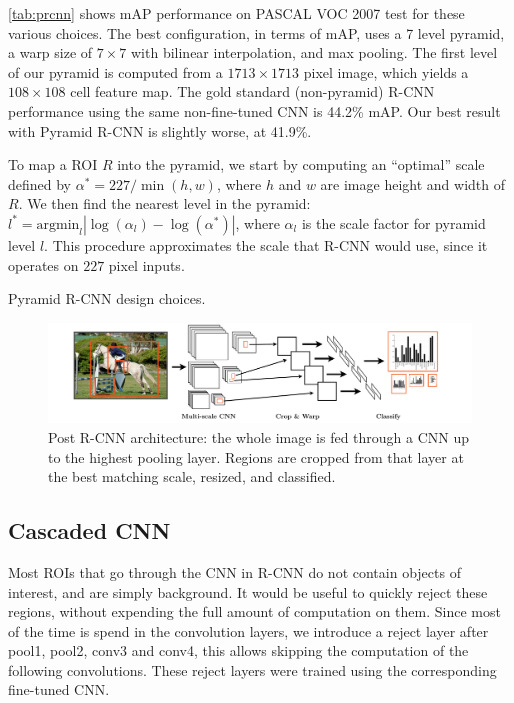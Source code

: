 \autoref{tab:prcnn} shows mAP performance on PASCAL VOC 2007 test for these various choices.
The best configuration, in terms of mAP, uses a 7 level pyramid, a warp size of $7 \times 7$ with bilinear interpolation, and max pooling.
The first level of our pyramid is computed from a $1713 \times 1713$ pixel image, which yields a $108 \times 108$ cell feature map.
The gold standard (non-pyramid) R-CNN performance using the same non-fine-tuned CNN is 44.2\% mAP.
Our best result with Pyramid R-CNN is slightly worse, at 41.9\%.

To map a ROI $R$ into the pyramid, we start by computing an ``optimal'' scale defined by $\alpha^* = 227/\min(h,w)$, where $h$ and $w$ are image height and width of $R$.
We then find the nearest level in the pyramid: $l^* = \textrm{argmin}_l |\log(\alpha_l) - \log(\alpha^*)|$, where $\alpha_l$ is the scale factor for pyramid level $l$.
This procedure approximates the scale that R-CNN would use, since it operates on $227$ pixel inputs.

\begin{table}[ht]
\centering
\caption{
    Pyramid R-CNN design choices.
}\label{tab:prcnn}
\small{

}
\end{table}

\begin{figure}[h!]
\begin{center}
\includegraphics[width=0.98\columnwidth]{figures/dense_rcnn.pdf}
\caption{
Post R-CNN architecture: the whole image is fed through a CNN up to the highest pooling layer.
Regions are cropped from that layer at the best matching scale, resized, and classified.
}\label{fig:dense_rcnn}
\end{center}
\end{figure}

\subsection{Cascaded CNN}\label{sec:ccnn}

Most ROIs that go through the CNN in R-CNN do not contain objects of interest, and are simply background.
It would be useful to quickly reject these regions, without expending the full amount of computation on them. Since most of the time is spend in the convolution layers, we introduce a reject layer after pool1, pool2, conv3 and conv4, this allows skipping the computation of the following convolutions. These reject layers were trained using the corresponding fine-tuned CNN.

